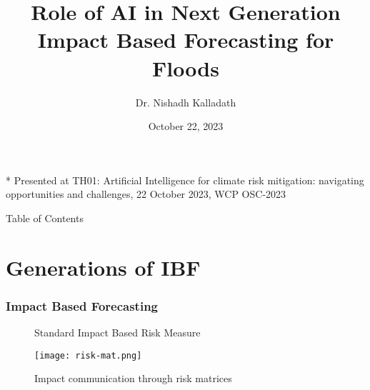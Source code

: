 \documentclass{beamer}
\title{Role of AI in Next Generation\\ Impact Based Forecasting for Floods}
\author{Dr. Nishadh Kalladath}
\institute{DRM Program\\ IGAD Climate Prediction and Applications Centre - ICPAC}
\date{October 22, 2023}
\begin{document}
\begin{frame}
    \maketitle

\footnotesize{* Presented at TH01: Artificial Intelligence for climate risk mitigation: navigating opportunities and challenges, 22 October 2023, WCP OSC-2023}
\end{frame}

%
%
%
%
%
%
%
%
%
%
%
\begin{frame}{Table of Contents}
	\tableofcontents
\end{frame}

\section{Generations of IBF}	

\begin{frame}
	\frametitle{Impact Based Forecasting}
	\begin{figure}[h]
		\centering
\caption{Standard Impact Based Risk Measure}
\label{fig:my_tikz}
\end{figure}


\begin{figure}
	\texttt{[image: risk-mat.png]} 
	\caption{Impact communication through risk matrices}
\end{figure}
\end{frame}
\end{document}
